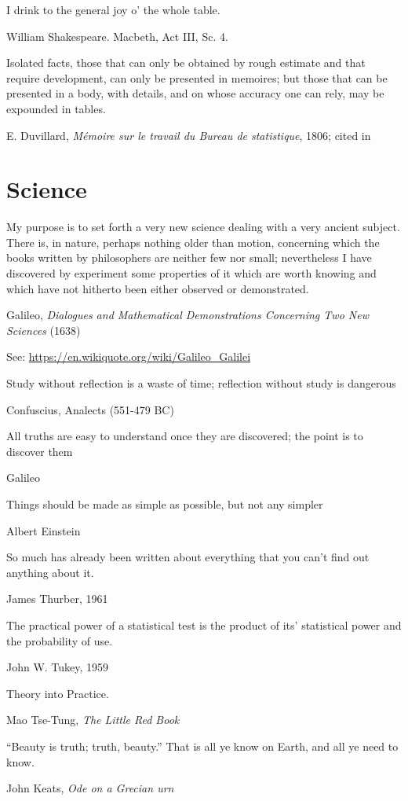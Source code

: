 \epigraph{I drink to the general joy o' the whole table.}{William Shakespeare. Macbeth, Act III, Sc. 4.}

\epigraph{Isolated facts, those that can only be obtained by rough estimate and that require development, can only be presented in memoires; but those that can be presented in a body, with details, and on whose accuracy one can rely, may be expounded in tables.}{E. Duvillard, \emph{M{\'e}moire sur le travail du Bureau de statistique}, 1806; cited in \citet[p. 38]{Derosieres:98}}







\section{Science}

\epigraph{My purpose  is to  set forth  a very  new science  dealing with  a very  ancient subject.  There  is, in  nature, perhaps  nothing older than motion, concerning which the books written by philosophers are neither few nor small;  nevertheless I have discovered by experiment some properties of it which are worth knowing and which have not hitherto been either observed or demonstrated.} {Galileo, \emph{Dialogues and Mathematical Demonstrations Concerning Two New Sciences} (1638)}
See: \url{https://en.wikiquote.org/wiki/Galileo_Galilei}

\epigraph{Study without reflection is a waste of time; reflection without study is dangerous}{Confuscius, Analects (551-479 BC)}

\epigraph{All truths are easy to understand once they are discovered; the point is to discover them}{Galileo}

\epigraph{Things should be made as simple as possible, but not any simpler}{Albert Einstein}

\epigraph{So much has already been written about everything that you can't find out anything about it.}{James Thurber, 1961}

\epigraph{The practical power of a statistical test is the product of its' statistical power and the probability of use.}{John W. Tukey, 1959 \citep{Tukey:59}}

\epigraph{Theory into Practice.}{Mao Tse-Tung, \emph{The Little Red Book}}

\epigraph{``Beauty is truth; truth, beauty.'' That is all ye know on Earth, and all ye need to know.}{John Keats, \emph{Ode on a Grecian urn}}

